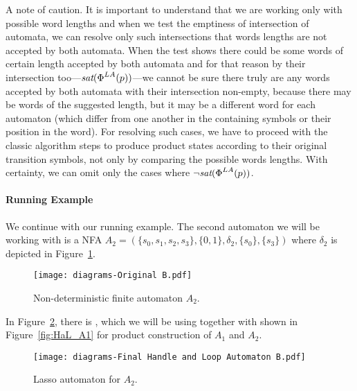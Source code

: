 A note of caution. It is important to understand that we are working only with possible word lengths and when we test the emptiness of intersection of automata, we can resolve only such intersections that words lengths are not accepted by both automata. When the test shows there could be some words of certain length accepted by both automata and for that reason by their intersection too---$\emph{sat}(\emph{$\Phi$}^{LA}(p))$---we cannot be sure there truly are any words accepted by both automata with their intersection non-empty, because there may be words of the suggested length, but it may be a different word for each automaton (which differ from one another in the containing symbols or their position in the word). For resolving such cases, we have to proceed with the classic algorithm steps to produce product states according to their original transition symbols, not only by comparing the possible words lengths. With certainty, we can omit only the cases where $\neg \emph{sat}(\emph{$\Phi$}^{LA}(p))$.

\paragraph{Running Example}

We continue with our running example. The second automaton we will be working with is a NFA $A_2 = (\{s_0, s_1, s_2, s_3\}, \{0, 1\}, \delta_2, \{s_0\}, \{s_3\}) $ where $\delta_2$ is depicted in Figure~\ref{fig:NFA_A2_orig}.

\begin{figure}[ht]
    \centering
	\texttt{[image: diagrams-Original B.pdf]}
	\caption{Non-deterministic finite automaton $A_2$.}
	\label{fig:NFA_A2_orig}
\end{figure}

In Figure~\ref{fig:HaL_A2}, there is , which we will be using together with  shown in Figure~\ref{fig:HaL_A1} for product construction of $A_1$ and $A_2$.

\begin{figure}[ht]
    \centering
	\texttt{[image: diagrams-Final Handle and Loop Automaton B.pdf]}
	\caption{Lasso automaton  for $A_2$.}
	\label{fig:HaL_A2}
\end{figure}

